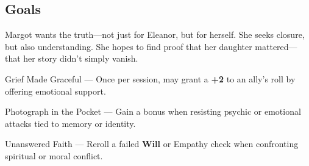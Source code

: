 \documentclass[nodeprecatedcode,bg=print]{dndbook/dndbook}
\begin{document}
\begin{WyrdCharacterSheet}
    \subsection{Goals}
    Margot wants the truth—not just for Eleanor, but for herself. She seeks closure, but also understanding. She hopes to find proof that her daughter mattered—that her story didn’t simply vanish.
  
    \begin{WyrdStatsBlock}[profile=img/characters/margot_delaney]
        \SkillsBox[%
            expert={Empathy},%
            skilled={Will, Insight},%
            novice={Lore, Focus, Persuasion},%
        ]
  
        \begin{TraitsBox}
            \item[Grief Made Graceful] — Once per session, may grant a \textbf{+2} to an ally's roll by offering emotional support.
            \item[Photograph in the Pocket] — Gain a bonus when resisting psychic or emotional attacks tied to memory or identity.
            \item[Unanswered Faith] — Reroll a failed \textbf{Will} or Empathy check when confronting spiritual or moral conflict.
        \end{TraitsBox}
  
        \DamageBox[%
        ]
    \end{WyrdStatsBlock}
\end{WyrdCharacterSheet}
  
\end{document}

